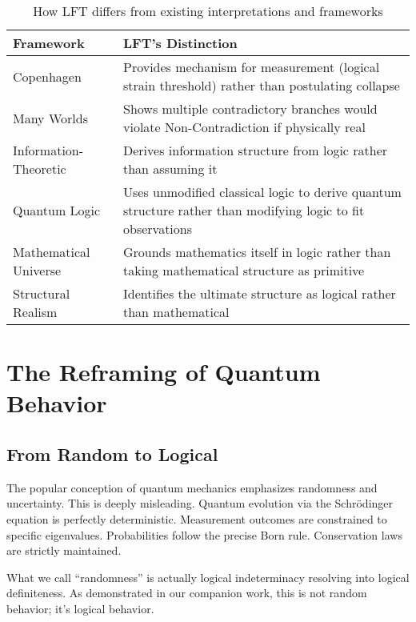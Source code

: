 \documentclass[12pt,a4paper]{article}
\begin{document}
\begin{table}[h]
\centering
\begin{tabular}{|p{3cm}|p{9cm}|}
\hline
\textbf{Framework} & \textbf{LFT's Distinction} \\
\hline
Copenhagen & Provides mechanism for measurement (logical strain threshold) rather than postulating collapse \citep{zurek2003decoherence} \\
\hline
Many Worlds & Shows multiple contradictory branches would violate Non-Contradiction if physically real \citep{everett1957relative} \\
\hline
Information-Theoretic & Derives information structure from logic rather than assuming it \citep{brukner2014quantum} \\
\hline
Quantum Logic & Uses unmodified classical logic to derive quantum structure rather than modifying logic to fit observations \citep{isham1995lectures} \\
\hline
Mathematical Universe & Grounds mathematics itself in logic rather than taking mathematical structure as primitive \citep{tegmark2008mathematical} \\
\hline
Structural Realism & Identifies the ultimate structure as logical rather than mathematical \citep{ladyman2007every, french2006structure} \\
\hline
\end{tabular}
\caption{How LFT differs from existing interpretations and frameworks}
\end{table}

\section{The Reframing of Quantum Behavior}

\subsection{From Random to Logical}

The popular conception of quantum mechanics emphasizes randomness and uncertainty. This is deeply misleading. Quantum evolution via the Schrödinger equation is perfectly deterministic. Measurement outcomes are constrained to specific eigenvalues. Probabilities follow the precise Born rule. Conservation laws are strictly maintained.

What we call ``randomness'' is actually logical indeterminacy resolving into logical definiteness. As demonstrated in our companion work, this is not random behavior; it's logical behavior.
\end{document}
